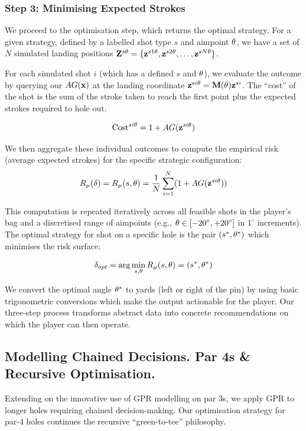 \documentclass[11pt, letterpaper]{article}
\begin{document}
\subsubsection{Step 3: Minimising Expected Strokes}
\label{subsec: minimise}

We proceed to the optimisation step, which returns the optimal strategy. For a given strategy, defined by a labelled shot type $s$ and aimpoint $\theta$, we have a set of $N$ simulated landing positions $\mathbf{Z}^{s\theta} = \{\mathbf{z}^{s1\theta}, \mathbf{z}^{s2\theta}, \ldots, \mathbf{z}^{sN\theta}\}$. 

For each simulated shot $i$ (which has a defined $s$ and $\theta$), we evaluate the outcome by querying our  $AG(\mathbf{x})$ at the landing coordinate $\mathbf{z}^{si\theta} =  \mathbf{M}(\theta)\mathbf{z}^{si} $. The ``cost'' of the shot is the sum of the stroke taken to reach the first point plus the expected strokes required to hole out.

$$\text{Cost}^{si\theta} = 1 + AG(\mathbf{z}^{si\theta} )$$

We then aggregate these individual outcomes to compute the empirical risk (average expected strokes) for the specific strategic configuration:
$$R_\mu(\delta) = R_\mu(s, \theta) = \frac{1}{N} \sum ^N_{i=1} (1+ AG(\mathbf{z}^{si\theta}))$$

This computation is repeated iteratively across all feasible shots in the player's bag and a discretised range of aimpoints (e.g., $\theta \in [-20^\circ, +20^\circ]$ in $1^\circ$ increments). The optimal strategy for shot on a specific hole is the pair $(s^*, \theta^*)$ which minimises the risk surface:

$$\delta_{opt} = \arg \min_{s, \theta} R_\mu(s, \theta) = (s^*, \theta^*)$$

We convert the optimal angle $\theta^*$ to yards (left or right of the pin) by using basic trigonometric conversions which make the output actionable for the player. Our three-step process transforms abstract data into concrete recommendations on which the player can then operate.

\subsection{Modelling Chained Decisions. Par 4s \& Recursive Optimisation.} 
\label{subsec: par4}
Extending on the innovative use of GPR modelling on par 3s, we apply GPR to longer holes requiring chained decision-making. Our optimisation strategy for par-4 holes continues the recursive ``green-to-tee'' philosophy. 
\end{document}
